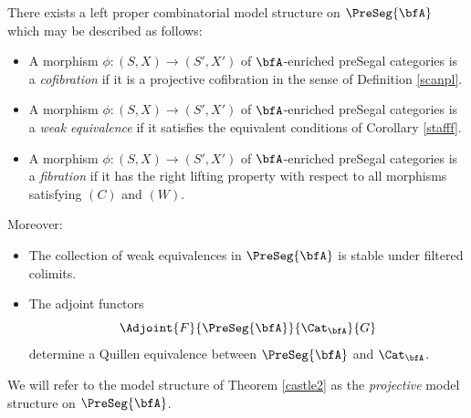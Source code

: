 \begin{theorem}\label{castle2}
There exists a left proper combinatorial model structure on $\PreSeg{\bfA}$ which may be described as follows:
\begin{itemize}
\item[$(C)$] A morphism $\phi: (S,X) \rightarrow (S',X')$ of $\bfA$-enriched preSegal categories is a {\it cofibration} if it is a projective cofibration in the sense of Definition \ref{scanpl}.
\item[$(W)$] A morphism $\phi: (S,X) \rightarrow (S',X')$ of $\bfA$-enriched preSegal categories is a {\it weak equivalence} if it satisfies the equivalent conditions of Corollary \ref{stafff}.
\item[$(F)$] A morphism $\phi: (S,X) \rightarrow (S',X')$ of $\bfA$-enriched preSegal categories is
a {\it fibration} if it has the right lifting property with respect to all morphisms satisfying
$(C)$ and $(W)$.
\end{itemize}
Moreover:
\begin{itemize}
\item[$(a)$] The collection of weak equivalences in $\PreSeg{\bfA}$ is stable under filtered colimits.
\item[$(b)$] The adjoint functors
$$ \Adjoint{F}{ \PreSeg{\bfA}}{ \Cat_{\bfA}}{G}$$
determine a Quillen equivalence between $\PreSeg{\bfA}$ and $\Cat_{\bfA}$.
\end{itemize}
\end{theorem}

\begin{remark}
We will refer to the model structure of Theorem \ref{castle2} as the {\it projective} model structure
on $\PreSeg{\bfA}$.
\end{remark}

